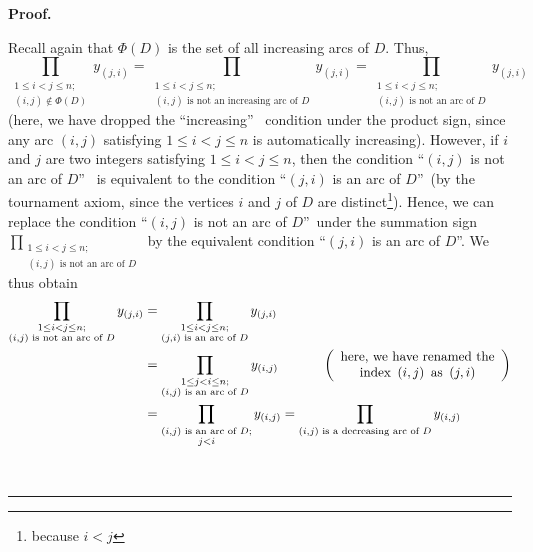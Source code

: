 \documentclass[numbers=enddot,12pt,final,onecolumn,notitlepage]{scrartcl}%
\numberwithin{exer}{subsection}
\theoremstyle{definition}
\newenvironment{fineprint}{\begin{small}}{\end{small}}
\newenvironment{proof}[1][Proof]{\noindent\textbf{#1.} }{\ \rule{0.5em}{0.5em}}
\let\prodnonlimits\prod
\renewcommand{\prod}{\prodnonlimits\limits}
\begin{document}
\begin{proof}
\begin{fineprint}
Recall again that $\Phi\left(  D\right)  $ is the set of all increasing arcs
of $D$. Thus,%
\[
\prod_{\substack{1\leq i<j\leq n;\\\left(  i,j\right)  \notin\Phi\left(
D\right)  }}y_{\left(  j,i\right)  }=\prod_{\substack{1\leq i<j\leq
n;\\\left(  i,j\right)  \text{ is not an increasing arc of }D}}y_{\left(
j,i\right)  }=\prod_{\substack{1\leq i<j\leq n;\\\left(  i,j\right)  \text{ is
not an arc of }D}}y_{\left(  j,i\right)  }%
\]
(here, we have dropped the \textquotedblleft increasing\textquotedblright%
\ condition under the product sign, since any arc $\left(  i,j\right)  $
satisfying $1\leq i<j\leq n$ is automatically increasing). However, if $i$ and
$j$ are two integers satisfying $1\leq i<j\leq n$, then the condition
\textquotedblleft$\left(  i,j\right)  $ is not an arc of $D$\textquotedblright%
\ is equivalent to the condition \textquotedblleft$\left(  j,i\right)  $ is an
arc of $D$\textquotedblright\ (by the tournament axiom, since the vertices $i$
and $j$ of $D$ are distinct\footnote{because $i<j$}). Hence, we can replace
the condition \textquotedblleft$\left(  i,j\right)  $ is not an arc of
$D$\textquotedblright\ under the summation sign $\prod_{\substack{1\leq
i<j\leq n;\\\left(  i,j\right)  \text{ is not an arc of }D}}$ by the
equivalent condition \textquotedblleft$\left(  j,i\right)  $ is an arc of
$D$\textquotedblright. We thus obtain%
\begin{align*}
\prod_{\substack{1\leq i<j\leq n;\\\left(  i,j\right)  \text{ is not an arc of
}D}}y_{\left(  j,i\right)  }  &  =\prod_{\substack{1\leq i<j\leq n;\\\left(
j,i\right)  \text{ is an arc of }D}}y_{\left(  j,i\right)  }\\
&  =\prod_{\substack{1\leq j<i\leq n;\\\left(  i,j\right)  \text{ is an arc of
}D}}y_{\left(  i,j\right)  }\ \ \ \ \ \ \ \ \ \ \left(
\begin{array}
[c]{c}%
\text{here, we have renamed the}\\
\text{index }\left(  i,j\right)  \text{ as }\left(  j,i\right)
\end{array}
\right) \\
&  =\prod_{\substack{\left(  i,j\right)  \text{ is an arc of }D;\\j<i}%
}y_{\left(  i,j\right)  }=\prod_{\left(  i,j\right)  \text{ is a decreasing
arc of }D}y_{\left(  i,j\right)  }%

\end{align*}
\end{fineprint}
\end{proof}
\end{document}
